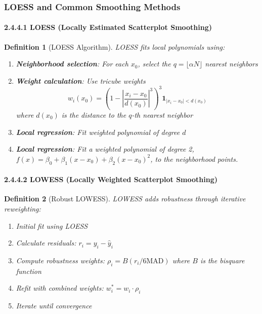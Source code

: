 \documentclass{article}
\newtheorem{definition}{Definition}
\begin{document}
\subsubsection{LOESS and Common Smoothing Methods}

\paragraph{2.4.4.1 LOESS (Locally Estimated Scatterplot Smoothing)}

\begin{definition}[LOESS Algorithm]
LOESS fits local polynomials using:
\begin{enumerate}
    \item \textbf{Neighborhood selection}: For each $x_0$, select the $q = \lfloor \alpha N \rfloor$ nearest neighbors
    \item \textbf{Weight calculation}: Use tricube weights
    \begin{equation}
    w_i(x_0) = \left(1 - \left|\frac{x_i - x_0}{d(x_0)}\right|^3\right)^3 \mathbf{1}_{|x_i - x_0| < d(x_0)}
    \end{equation}
    where $d(x_0)$ is the distance to the $q$-th nearest neighbor
    \item \textbf{Local regression}: Fit weighted polynomial of degree $d$ \item \textbf{Local regression}: Fit a weighted polynomial of degree 2, $f(x) = \beta_0 + \beta_1(x - x_0) + \beta_2(x - x_0)^2$, to the neighborhood points.
\end{enumerate}
\end{definition}

\paragraph{2.4.4.2 LOWESS (Locally Weighted Scatterplot Smoothing)}

\begin{definition}[Robust LOWESS]
LOWESS adds robustness through iterative reweighting:
\begin{enumerate}
    \item Initial fit using LOESS
    \item Calculate residuals: $r_i = y_i - \hat{y}_i$
    \item Compute robustness weights: $\rho_i = B(r_i/6\text{MAD})$ where $B$ is the bisquare function
    \item Refit with combined weights: $w_i^* = w_i \cdot \rho_i$
    \item Iterate until convergence
\end{enumerate}
\end{definition}
\end{document}
